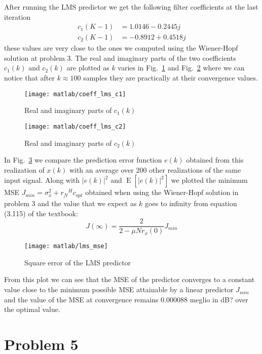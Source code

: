 \documentclass{article}
\renewcommand{\vec}[1]{
  \underline{#1}
}
\newcommand{\E}[1]{
  \operatorname{E}\left[ #1 \right]
}
\newcommand{\abs}[1]{
  \left| #1 \right|
}
\begin{document}
  After running the LMS predictor we get the following filter
  coefficients at the last iteration
\begin{align*}
  c_1(K-1) &= 1.0146 - 0.2445j   \\
  c_2(K-1) &= -0.8912 + 0.4518j
\end{align*}
{\color{red} these values are very close} to the ones we computed
using the Wiener-Hopf solution at problem 3. The real and imaginary
parts of the two coefficients $c_1(k)$ and $c_2(k)$ are plotted as $k$
varies in Fig.~\ref{plot:coeff_lms_c1} and
Fig.~\ref{plot:coeff_lms_c2} where we can notice that after $k \approx 100$
samples they are practically at their convergence values.
\begin{figure}[htbp]
  \centering
  \texttt{[image: matlab/coeff\_lms\_c1]}
  \caption{Real and imaginary parts of $c_1(k)$}
  \label{plot:coeff_lms_c1}
\end{figure}
\begin{figure}[htbp]
  \centering
  \texttt{[image: matlab/coeff\_lms\_c2]}
  \caption{Real and imaginary parts of $c_2(k)$}
  \label{plot:coeff_lms_c2}
\end{figure}

In Fig.~\ref{plot:lms_mse} we compare the prediction error function
$e(k)$ obtained from this realization of $x(k)$ with an average over
200 other realizations of the same input signal.  Along with
$\abs{e(k)}^2$ and $\E{ \abs{e(k)}^2 }$ we plotted the minimum MSE
$J_{min} = \sigma^2_x + \vec{r_N}^Hc_{opt}$ obtained when using the
Wiener-Hopf solution in problem 3 and the value that we expect as $k$
goes to infinity from equation (3.115) of the textbook:
\[ J(\infty) = \frac{2}{2-\mu N r_x(0)}J_{min} \]
\begin{figure}[htbp]
  \centering
  \texttt{[image: matlab/lms\_mse]}
  \caption{Square error of the LMS predictor}
  \label{plot:lms_mse}
\end{figure}
From this plot we can see that the MSE of the predictor converges to a
constant value close to {\color{red} the minimum possible MSE
  attainable by a linear predictor $J_{min}$} and the value of the MSE
at convergence remains 0.000088 {\color{red} meglio in dB?} over the
optimal value.
\section*{Problem 5}
\end{document}
